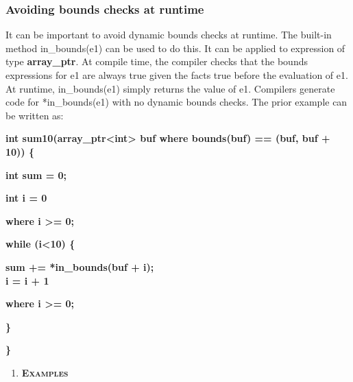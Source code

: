 \documentclass[]{article}
\begin{document}
\subsubsection{\texorpdfstring{\protect\hypertarget{ux5fToc420589194}{}{\protect\hypertarget{ux5fRef421259876}{}{\protect\hypertarget{ux5fToc422906985}{}{\protect\hypertarget{ux5fToc424307725}{}{\protect\hypertarget{ux5fToc426641123}{}{\protect\hypertarget{ux5fToc435434998}{}{\protect\hypertarget{ux5fToc437460831}{}{\protect\hypertarget{ux5fToc440445512}{}{\protect\hypertarget{ux5fToc440449294}{}{\protect\hypertarget{ux5fToc440551944}{}{}}}}}}}}}}Avoiding
bounds checks at
runtime}{Avoiding bounds checks at runtime}}\label{avoiding-bounds-checks-at-runtime}

It can be important to avoid dynamic bounds checks at runtime. The
built-in method in\_bounds(e1) can be used to do this. It can be applied
to expression of type \textbf{array\_ptr}. At compile time, the compiler
checks that the bounds expressions for e1 are always true given the
facts true before the evaluation of e1. At runtime, in\_bounds(e1)
simply returns the value of e1. Compilers generate code for
*in\_bounds(e1) with no dynamic bounds checks. The prior example can be
written as:

\textbf{int sum10(array\_ptr\textless{}int\textgreater{} buf where
bounds(buf) == (buf, buf + 10)) \{}

\textbf{int sum = 0;}

\textbf{int i = 0}

\textbf{where i \textgreater{}= 0;}

\textbf{while (i\textless{}10) \{}

\textbf{sum += *in\_bounds(buf + i);\\
i = i + 1}

\textbf{where i \textgreater{}= 0;}

\textbf{\}}

\textbf{\}}

\begin{enumerate}
\def\labelenumi{\arabic{enumi}.}
\item
  \protect\hypertarget{ux5fToc420589195}{}{\protect\hypertarget{ux5fToc422906986}{}{\protect\hypertarget{ux5fToc424307726}{}{\protect\hypertarget{ux5fToc426641124}{}{\protect\hypertarget{ux5fToc435434999}{}{\protect\hypertarget{ux5fToc437460832}{}{\protect\hypertarget{ux5fToc440445513}{}{\protect\hypertarget{ux5fToc440449295}{}{\protect\hypertarget{ux5fToc440551945}{}{}}}}}}}}}\textbf{\textsc{Examples}}
\end{enumerate}
\end{document}
